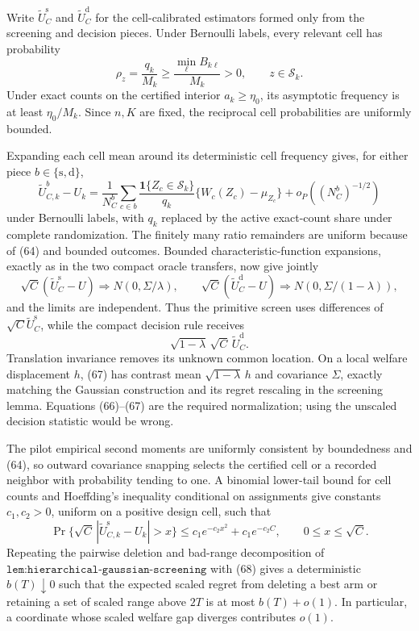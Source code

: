 Write \(\widetilde U_C^{\mathrm s}\) and \(\widetilde U_C^{\mathrm d}\) for the cell-calibrated estimators formed only from the screening and decision pieces.  Under Bernoulli labels, every relevant cell has probability
\[
\rho_z=\frac{q_k}{M_k}
\geq\frac{\min_\ell B_{k\ell}}{M_k}>0,
\qquad z\in\mathcal S_k. \tag{64}
\]
Under exact counts on the certified interior \(a_k\geq\eta_0\), its asymptotic frequency is at least \(\eta_0/M_k\).  Since \(n,K\) are fixed, the reciprocal cell probabilities are uniformly bounded.

Expanding each cell mean around its deterministic cell frequency gives, for either piece \(b\in\{\mathrm s,\mathrm d\}\),
\[
\widetilde U_{C,k}^{b}-U_k
=\frac1{N_C^b}\sum_{c\in b}
\frac{\mathbf1\{Z_c\in\mathcal S_k\}}{q_k}
\{W_c(Z_c)-\mu_{Z_c}\}+o_P((N_C^b)^{-1/2}) \tag{65}
\]
under Bernoulli labels, with \(q_k\) replaced by the active exact-count share under complete randomization.  The finitely many ratio remainders are uniform because of (64) and bounded outcomes.  Bounded characteristic-function expansions, exactly as in the two compact oracle transfers, now give jointly
\[
\sqrt C(\widetilde U_C^{\mathrm s}-U)
\Rightarrow N(0,\Sigma/\lambda),\qquad
\sqrt C(\widetilde U_C^{\mathrm d}-U)
\Rightarrow N(0,\Sigma/(1-\lambda)), \tag{66}
\]
and the limits are independent.  Thus the primitive screen uses differences of \(\sqrt C\widetilde U_C^{\mathrm s}\), while the compact decision rule receives
\[
\sqrt{1-\lambda}\,\sqrt C\,\widetilde U_C^{\mathrm d}. \tag{67}
\]
Translation invariance removes its unknown common location.  On a local welfare displacement \(h\), (67) has contrast mean \(\sqrt{1-\lambda}\,h\) and covariance \(\Sigma\), exactly matching the Gaussian construction and its regret rescaling in the screening lemma.  Equations (66)--(67) are the required normalization; using the unscaled decision statistic would be wrong.

The pilot empirical second moments are uniformly consistent by boundedness and (64), so outward covariance snapping selects the certified cell or a recorded neighbor with probability tending to one.  A binomial lower-tail bound for cell counts and Hoeffding's inequality conditional on assignments give constants \(c_1,c_2>0\), uniform on a positive design cell, such that
\[
\Pr\{\sqrt C\,|\widetilde U_{C,k}^{\mathrm s}-U_k|>x\}
\leq c_1e^{-c_2x^2}+c_1e^{-c_2C},
\qquad0\leq x\leq\sqrt C. \tag{68}
\]
Repeating the pairwise deletion and bad-range decomposition of \(\texttt{lem:hierarchical-gaussian-screening}\) with (68) gives a deterministic \(b(T)\downarrow0\) such that the expected scaled regret from deleting a best arm or retaining a set of scaled range above \(2T\) is at most \(b(T)+o(1)\).  In particular, a coordinate whose scaled welfare gap diverges contributes \(o(1)\).

